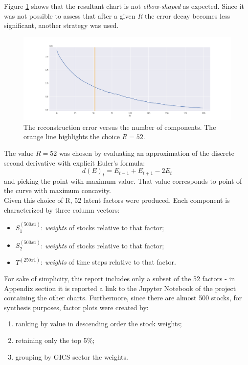 \documentclass[12pt]{extarticle}
\begin{document}
Figure \ref{fig:errors_trend_line} shows that the resultant chart is not \textit{elbow-shaped} as expected. Since it was not possible to assess that after a given \textit{R} the error decay becomes less significant, another strategy was used.

\begin{figure}[h]
	\centering
	\includegraphics[width=\textwidth]{errors_trend_line.png}
	\caption{The reconstruction error versus the number of components. The orange line highlights the choice $ R = 52 $.} 
	\label{fig:errors_trend_line}
\end{figure}

The value $ R = 52 $ was chosen by evaluating an approximation of the discrete second derivative with explicit Euler's formula:
$$
	d(E)_t = E_{t-1} + E_{t+1} - 2 E_t
$$
and picking the point with maximum value. That value corresponds to point of the curve with maximum concavity.\\ 

Given this choice of R, 52 latent factors were produced. Each component is characterized by three column vectors:
\begin{itemize}
	\item $S_1^{(500x1)}$: \textit{weights} of stocks relative to that factor;
	\item $S_2^{(500x1)}$: \textit{weights} of stocks relative to that factor;
	\item $T^{(250x1)}$: \textit{weights} of time steps relative to that factor.
\end{itemize}
For sake of simplicity, this report includes only a subset of the 52 factors - in Appendix section it is reported a link to the Jupyter Notebook of the project containing the other charts. Furthermore, since there are almost 500 stocks, for synthesis purposes, factor plots were created by:
\begin{enumerate}
	\item ranking by value in descending order the stock weights;
	\item retaining only the top 5\%;
	\item grouping by GICS sector the weights. 
\end{enumerate}
\end{document}
